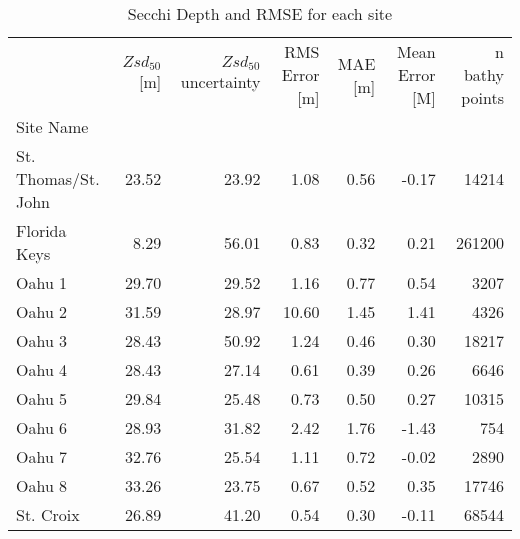 \begin{table}
\centering
\caption{Secchi Depth and RMSE for each site}
\label{tab:ocean_color_summary_by_site}
\begin{tabular}{lrrrrrr}
\toprule
{} &  $Zsd_{50}$[m] &  $Zsd_{50}$ uncertainty &  RMS Error [m] &  MAE [m] &  Mean Error [M] &  n bathy points \\
Site Name           &                &                         &                &          &                 &                 \\
\midrule
St. Thomas/St. John &          23.52 &                   23.92 &           1.08 &     0.56 &           -0.17 &           14214 \\
Florida Keys        &           8.29 &                   56.01 &           0.83 &     0.32 &            0.21 &          261200 \\
Oahu 1              &          29.70 &                   29.52 &           1.16 &     0.77 &            0.54 &            3207 \\
Oahu 2              &          31.59 &                   28.97 &          10.60 &     1.45 &            1.41 &            4326 \\
Oahu 3              &          28.43 &                   50.92 &           1.24 &     0.46 &            0.30 &           18217 \\
Oahu 4              &          28.43 &                   27.14 &           0.61 &     0.39 &            0.26 &            6646 \\
Oahu 5              &          29.84 &                   25.48 &           0.73 &     0.50 &            0.27 &           10315 \\
Oahu 6              &          28.93 &                   31.82 &           2.42 &     1.76 &           -1.43 &             754 \\
Oahu 7              &          32.76 &                   25.54 &           1.11 &     0.72 &           -0.02 &            2890 \\
Oahu 8              &          33.26 &                   23.75 &           0.67 &     0.52 &            0.35 &           17746 \\
St. Croix           &          26.89 &                   41.20 &           0.54 &     0.30 &           -0.11 &           68544 \\
\bottomrule
\end{tabular}
\end{table}
